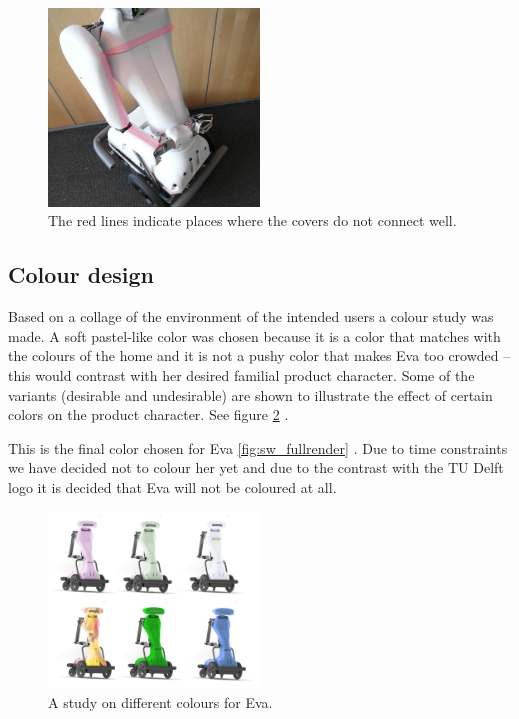 \documentclass[technical_document.tex]{subfiles}
\begin{document}
\begin{figure}[h]
	\centering
	\mbox{\includegraphics[width=0.5\textwidth]{Images/nonconnectingmodelsurfaces.png}}
	\caption{The red lines indicate places where the covers do not connect well.}
	\label{fig:connect}
\end{figure}

\subsection{Colour design}

Based on a collage of the environment of the intended users a colour study was made. A soft pastel-like color was chosen because it is a color that matches with the colours of the home and it is not a pushy color that makes Eva too crowded – this would contrast with her desired familial product character. Some of the variants (desirable and undesirable) are shown to illustrate the effect of certain colors on the product character. See figure \ref{fig:character} .

This is the final color chosen for Eva \ref{fig:sw_fullrender} . Due to time constraints we have decided not to colour her yet and due to the contrast with the TU Delft logo it is decided that Eva will not be coloured at all.
 
\begin{figure}[h]
	\centering
	\mbox{\includegraphics[width=0.5\textwidth]{Images/colorstudy.png}}
	\caption{A study on different colours for Eva.}
	\label{fig:character}
\end{figure}
\end{document}
